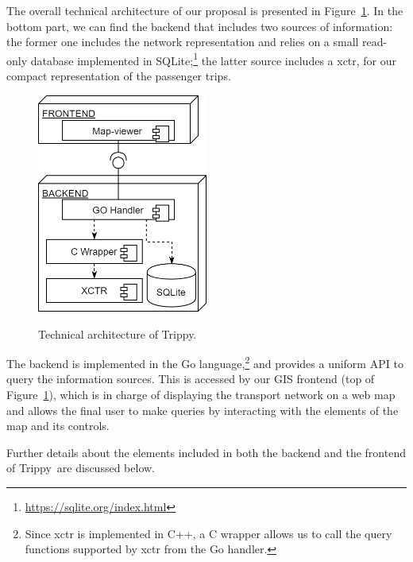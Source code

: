     The overall technical architecture of our proposal is presented in Figure~\ref{fig:arch:real}. In the bottom part, we can find the backend
    that includes two sources of information: the former one includes the network representation and relies on a small read-only database implemented in SQLite;\footnote{\url{https://sqlite.org/index.html}} the latter source includes a \gls{xctr}, for our compact representation of the passenger trips.
	
	\begin{figure}[ht]
		\begin{center}
			{\includegraphics[width=0.5\textwidth]{figures/tview.png}}
		\end{center}
		\caption{Technical architecture of Trippy.}
		\label{fig:arch:real}
	\end{figure}
	
	The backend is implemented in the Go language,\footnote{Since \gls{xctr} is implemented in C++, a \mbox{C} wrapper allows us to call the query functions supported by \gls{xctr} from the Go handler.} and provides a uniform API to query the information sources. This is accessed by our GIS frontend (top of Figure~\ref{fig:arch:real}), which is in charge of displaying the transport network on a web map and allows the final user to make queries by interacting with the elements of the map and its controls.

    Further details about the elements included in both the backend and the frontend of Trippy\ are discussed below.
    
